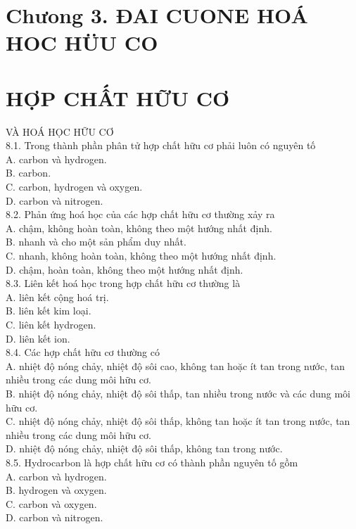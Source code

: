 \documentclass[10pt]{article}
\begin{document}
\section*{Chưong 3. ĐAI CUONE HOÁ HOC HÜU CO}
\section*{HỢP CHẤT HỮU CƠ}
VÀ HOÁ HỌC HỮU CƠ\\
8.1. Trong thành phần phân tử hợp chất hữu cơ phải luôn có nguyên tố\\
A. carbon và hydrogen.\\
B. carbon.\\
C. carbon, hydrogen và oxygen.\\
D. carbon và nitrogen.\\
8.2. Phản ứng hoá học của các hợp chất hữu cơ thường xảy ra\\
A. chậm, không hoàn toàn, không theo một hướng nhất định.\\
B. nhanh và cho một sản phẩm duy nhất.\\
C. nhanh, không hoàn toàn, không theo một hướng nhất định.\\
D. chậm, hoàn toàn, không theo một hướng nhất định.\\
8.3. Liên kết hoá học trong hợp chất hữu cơ thường là\\
A. liên kết cộng hoá trị.\\
B. liên kết kim loại.\\
C. liên kết hydrogen.\\
D. liên kết ion.\\
8.4. Các hợp chất hữu cơ thường có\\
A. nhiệt độ nóng chảy, nhiệt độ sôi cao, không tan hoặc ít tan trong nước, tan nhiều trong các dung môi hữu cơ.\\
B. nhiệt độ nóng chảy, nhiệt độ sôi thấp, tan nhiều trong nước và các dung môi hữu cơ.\\
C. nhiệt độ nóng chảy, nhiệt độ sôi thấp, không tan hoặc ít tan trong nước, tan nhiều trong các dung môi hữu cơ.\\
D. nhiệt độ nóng chảy, nhiệt độ sôi thấp, không tan trong nước.\\
8.5. Hydrocarbon là hợp chất hữu cơ có thành phần nguyên tố gồm\\
A. carbon và hydrogen.\\
B. hydrogen và oxygen.\\
C. carbon và oxygen.\\
D. carbon và nitrogen.\\
\end{document}
